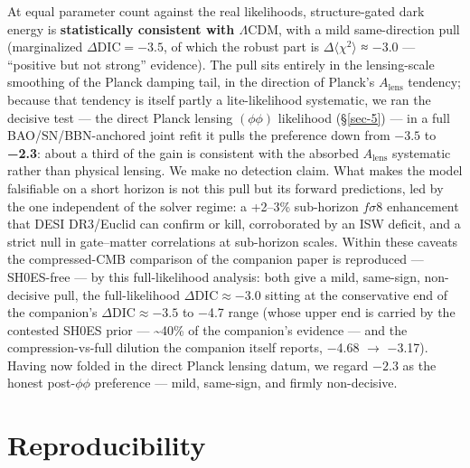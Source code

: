 \documentclass[preprint,12pt]{elsarticle}
\begin{document}
At equal parameter count against the real likelihoods, structure-gated
dark energy is \textbf{statistically consistent with
\(\Lambda \mathrm{CDM}\)}, with a mild same-direction pull (marginalized
\(\Delta \mathrm{DIC} = -3.5\), of which the robust part is
\(\Delta\)\(\langle\chi^2\rangle\) ≈ −3.0 --- ``positive but not
strong'' evidence). The pull sits entirely in the lensing-scale
smoothing of the Planck damping tail, in the direction of Planck's
\(A_{\mathrm{lens}}\) tendency; because that tendency is itself partly a
lite-likelihood systematic, we ran the decisive test --- the direct
Planck lensing \((\phi \phi )\) likelihood (§\ref{sec-5}) --- in a full
BAO/SN/BBN-anchored joint refit it pulls the preference down from
\(-3.5\) to \textbf{−2.3}: about a third of the gain is consistent with
the absorbed \(A_{\mathrm{lens}}\) systematic rather than physical
lensing. We make no detection claim. What makes the model falsifiable on
a short horizon is not this pull but its forward predictions, led by the
one independent of the solver regime: a +2--3\% sub-horizon
\(f\sigma 8\) enhancement that DESI DR3/Euclid can confirm or kill,
corroborated by an ISW deficit, and a strict null in gate--matter
correlations at sub-horizon scales. Within these caveats the
compressed-CMB comparison of the companion paper is reproduced ---
SH0ES-free --- by this full-likelihood analysis: both give a mild,
same-sign, non-decisive pull, the full-likelihood
\(\Delta \mathrm{DIC} \approx  -3.0\) sitting at the conservative end of
the companion's \(\Delta \mathrm{DIC} \approx  -3.5\) to −4.7 range
(whose upper end is carried by the contested SH0ES prior ---
\textasciitilde40\% of the companion's evidence --- and the
compression-vs-full dilution the companion itself reports, −4.68 \(\to\)
−3.17). Having now folded in the direct Planck lensing datum, we regard
\(-2.3\) as the honest post-\(\phi \phi\) preference --- mild,
same-sign, and firmly non-decisive.

\section*{Reproducibility}\label{reproducibility}
\end{document}
